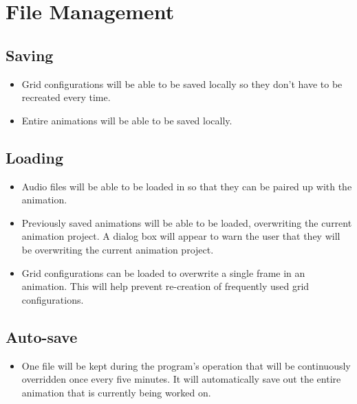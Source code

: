\documentclass[12pt]{article}
\begin{document}
 
    \section{File Management} 
        \subsection{Saving} 
        
        	\begin{itemize}
        		\item Grid configurations will be able to be saved locally so they don't have to be recreated every time.
            \end{itemize}
            
            \begin{itemize}
        		\item Entire animations will be able to be saved locally.
            \end{itemize}
            
        \subsection{Loading} 
        
        	\begin{itemize}
        		\item Audio files will be able to be loaded in so that they can be paired up with the animation.
            \end{itemize}
            
            \begin{itemize}
        		\item Previously saved animations will be able to be loaded, overwriting the current animation project. A dialog box will
                	appear to warn the user that they will be overwriting the current animation project.
        	\end{itemize}
            
            \begin{itemize}
        		\item Grid configurations can be loaded to overwrite a single frame in an animation. This will help prevent re-creation
                	of frequently used grid configurations.
        	\end{itemize}
            
        \subsection{Auto-save}
        	\begin{itemize}
            	\item One file will be kept during the program's operation that will be \newline continuously overridden once every 
                	five minutes. It will automatically save out the entire animation that is currently being worked on.
            \end{itemize}
            
\end{document}
